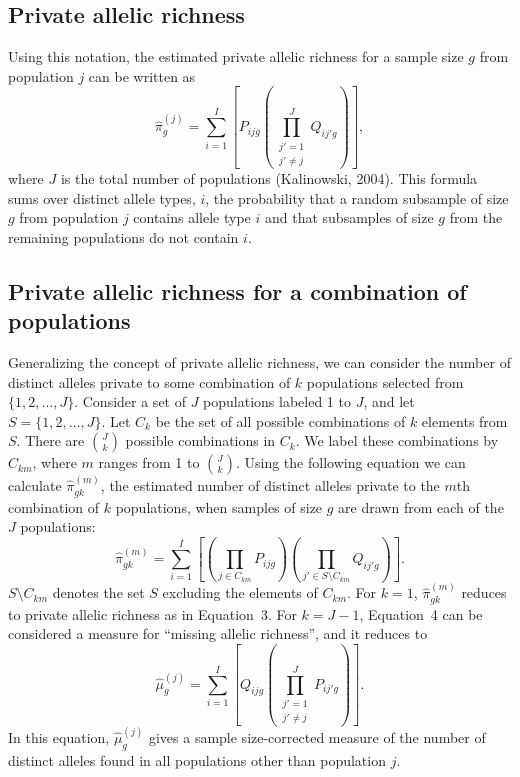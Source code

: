 \documentclass[11pt]{article}
\begin{document}
\subsection{Private allelic richness}

Using this notation, the estimated private allelic richness for a sample size
$g$ from population $j$ can be written as
\begin{equation}
  \hat{\pi}_g^{(j)} = \sum_{i=1}^{I}
    \left[ P_{ijg} \left( \prod_{\substack{j'=1 \\ j' \neq j}}^{J}
      Q_{ij'g} \right) \right],
\end{equation}
where $J$ is the total number of populations (Kalinowski, 2004). This formula
sums over distinct allele types, $i$, the probability that a random subsample
of size $g$ from population $j$ contains allele type $i$ and that subsamples of
size $g$ from the remaining populations do not contain $i$.

\subsection{Private allelic richness for a combination of populations}

Generalizing the concept of private allelic richness, we can consider the
number of distinct alleles private to some combination of $k$ populations
selected from $\{1, 2, \ldots, J\}$. Consider a set of $J$ populations labeled
1 to $J$, and let $S = \{1, 2, \ldots, J\}$. Let $C_k$ be the set of all
possible combinations of $k$ elements from $S$. There are $\binom{J}{k}$
possible combinations in $C_k$. We label these combinations by $C_{km}$, where
$m$ ranges from 1 to $\binom{J}{k}$. Using the following equation we can
calculate $\hat{\pi}_{gk}^{(m)}$, the estimated number of distinct alleles
private to the $m$th combination of $k$ populations, when samples of size $g$
are drawn from each of the $J$ populations:
\begin{equation}
  \hat{\pi}_{gk}^{(m)} = \sum_{i=1}^{I}
    \left[ \left( \prod_{j \in C_{km}} P_{ijg} \right)
           \left( \prod_{j' \in S \setminus C_{km}} Q_{ij'g} \right) \right].
\end{equation}
$S \setminus C_{km}$ denotes the set $S$ excluding the elements of
$C_{km}$. For $k = 1$, $\hat{\pi}_{gk}^{(m)}$ reduces to private allelic
richness as in Equation~3. For $k = J-1$, Equation~4 can be considered a
measure for ``missing allelic richness'', and it reduces to
\begin{equation}
  \hat{\mu}_g^{(j)} = \sum_{i=1}^{I}
    \left[ Q_{ijg} \left( \prod_{\substack{j'=1 \\ j' \neq j}}^{J}
      P_{ij'g} \right) \right].
\end{equation}
In this equation, $\hat{\mu}_g^{(j)}$ gives a sample size-corrected measure of
the number of distinct alleles found in all populations other than population
$j$.
\end{document}
